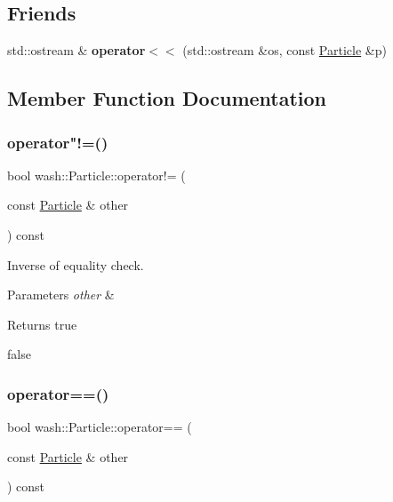 \subsection*{Friends}
\begin{DoxyCompactItemize}
\item 
\mbox{\label{classwash_1_1Particle_ad7d60c63b6d14d1d0d4fe42d4e9dc8bc}} 
std\+::ostream \& {\bfseries operator$<$$<$} (std\+::ostream \&os, const \mbox{\hyperlink{classwash_1_1Particle}{Particle}} \&p)
\end{DoxyCompactItemize}


\subsection{Member Function Documentation}
\mbox{\label{classwash_1_1Particle_a32f1334a8a0b273a57355956d7e9fe63}} 
\subsubsection{\texorpdfstring{operator"!=()}{operator!=()}}
{\footnotesize\ttfamily bool wash\+::\+Particle\+::operator!= (\begin{DoxyParamCaption}\item[{const \mbox{\hyperlink{classwash_1_1Particle}{Particle}} \&}]{other }\end{DoxyParamCaption}) const}



Inverse of equality check. 


\begin{DoxyParams}{Parameters}
{\em other} & \\
\hline
\end{DoxyParams}
\begin{DoxyReturn}{Returns}
true 

false 
\end{DoxyReturn}
\mbox{\label{classwash_1_1Particle_a32369e6edba4277ebc71917a37c2503d}} 
\subsubsection{\texorpdfstring{operator==()}{operator==()}}
{\footnotesize\ttfamily bool wash\+::\+Particle\+::operator== (\begin{DoxyParamCaption}\item[{const \mbox{\hyperlink{classwash_1_1Particle}{Particle}} \&}]{other }\end{DoxyParamCaption}) const}



